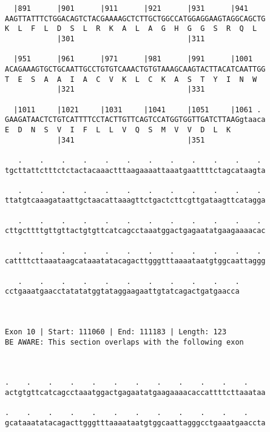 \documentclass{article}
\begin{document}
\begin{Verbatim}
  |891      |901      |911      |921      |931      |941    
AAGTTATTTCTGGACAGTCTACGAAAAGCTCTTGCTGGCCATGGAGGAAGTAGGCAGCTG
K  L  F  L  D  S  L  R  K  A  L  A  G  H  G  G  S  R  Q  L  
            |301                          |311              
  
  |951      |961      |971      |981      |991      |1001   
ACAGAAAGTGCTGCAATTGCCTGTGTCAAACTGTGTAAAGCAAGTACTTACATCAATTGG
T  E  S  A  A  I  A  C  V  K  L  C  K  A  S  T  Y  I  N  W  
            |321                          |331              
  
  |1011     |1021     |1031     |1041     |1051     |1061 . 
GAAGATAACTCTGTCATTTTCCTACTTGTTCAGTCCATGGTGGTTGATCTTAAGgtaaca
E  D  N  S  V  I  F  L  L  V  Q  S  M  V  V  D  L  K        
            |341                          |351              
  
   .    .    .    .    .    .    .    .    .    .    .    . 
tgcttattctttctctactacaaactttaagaaaattaaatgaattttctagcataagta
                                                            
   .    .    .    .    .    .    .    .    .    .    .    . 
ttatgtcaaagataattgctaacattaaagttctgactcttcgttgataagttcatagga
                                                            
   .    .    .    .    .    .    .    .    .    .    .    . 
cttgcttttgttgttactgtgttcatcagcctaaatggactgagaatatgaagaaaacac
                                                            
   .    .    .    .    .    .    .    .    .    .    .    . 
cattttcttaaataagcataaatatacagacttgggtttaaaataatgtggcaattaggg
                                                            
   .    .    .    .    .    .    .    .    .    .    .
cctgaaatgaacctatatatggtataggaagaattgtatcagactgatgaacca
                                                      
                                                      
 
Exon 10 | Start: 111060 | End: 111183 | Length: 123
BE AWARE: This section overlaps with the following exon



.    .    .    .    .    .    .    .    .    .    .    .    
actgtgttcatcagcctaaatggactgagaatatgaagaaaacaccattttcttaaataa
                                                            
.    .    .    .    .    .    .    .    .    .    .    .    
gcataaatatacagacttgggtttaaaataatgtggcaattagggcctgaaatgaaccta
                                                            

\end{Verbatim}
\end{document}
